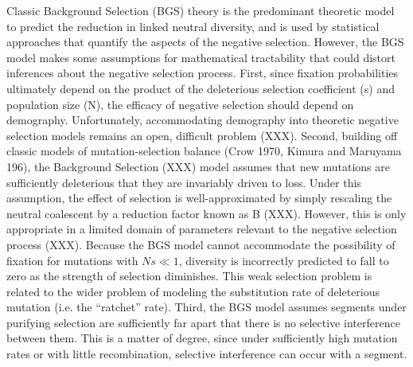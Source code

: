 \documentclass[11pt]{article}
\begin{document}
Classic Background Selection (BGS) theory is the predominant theoretic model to
predict the reduction in linked neutral diversity, and is used by statistical
approaches that quantify the aspects of the negative selection. However, the
BGS model makes some assumptions for mathematical tractability that could
distort inferences about the negative selection process. First, since fixation
probabilities ultimately depend on the product of the deleterious selection
coefficient (s) and population size (N), the efficacy of negative selection
should depend on demography. Unfortunately, accommodating demography into
theoretic negative selection models remains an open, difficult problem (XXX).
Second, building off classic models of mutation-selection balance (Crow 1970,
Kimura and Maruyama 196), the Background Selection (XXX) model assumes that new
mutations are sufficiently deleterious that they are invariably driven to loss.
Under this assumption, the effect of selection is well-approximated by simply
rescaling the neutral coalescent by a reduction factor known as B (XXX).
However, this is only appropriate in a limited domain of parameters relevant to
the negative selection process (XXX). Because the BGS model cannot accommodate
the possibility of fixation for mutations with $Ns \ll 1$, diversity is
incorrectly predicted to fall to zero as the strength of selection diminishes.
This weak selection problem is related to the wider problem of modeling the
substitution rate of deleterious mutation (i.e. the “ratchet” rate). Third, the
BGS model assumes segments under purifying selection are sufficiently far apart
that there is no selective interference between them. This is a matter of
degree, since under sufficiently high mutation rates or with little
recombination, selective interference can occur with a segment. 
\end{document}
